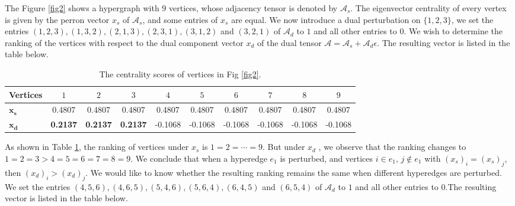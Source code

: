 \documentclass[preprint,12pt]{elsarticle}
\begin{document}
\begin{spacing}{1.15}
The Figure \ref{fig2} shows a hypergraph with $9$ vertices, whose adjacency tensor is denoted by $\mathcal{A}_s$.
The eigenvector centrality of every vertex is given by the perron vector $x_s$ of $\mathcal{A}_s$,
and some entries of $x_s$ are equal.
We now introduce a dual perturbation on $\{1, 2, 3\}$, we set the entries $(1,2,3),(1,3,2),(2,1,3),(2,3,1),(3,1,2)$ and $(3,2,1)$ of $\mathcal{A}_d$ to $1$ and all other entries to $0$.
We wish to determine the ranking of the vertices with respect to the dual component vector $x_d$ of the dual tensor $\mathcal{A}= \mathcal{A}_s + \mathcal{A}_d \epsilon$. The resulting vector is listed in the table below.

\begin{table}[h]
    \tiny
    \centering
    \caption{The centrality scores of vertices in Fig \ref{fig2}.}
    \label{table3}
    \begin{tabular}{lccccccccc}  %
    \toprule
    \textbf{Vertices} & \textbf{$1$} & \textbf{$2$} & \textbf{$3$} & \textbf{$4$} & \textbf{$5$} & \textbf{$6$}& \textbf{$7$}& \textbf{$8$}& \textbf{$9$} \\ \midrule
    \textbf{$\boldsymbol{x_s}$}  & 0.4807 & 0.4807 & 0.4807 & 0.4807 &0.4807 & 0.4807 & 0.4807 & 0.4807 & 0.4807 \\
    \textbf{$\boldsymbol{x_d}$} & \textbf{0.2137} & \textbf{0.2137} &\textbf{0.2137}  & -0.1068 & -0.1068 & -0.1068 & -0.1068 &-0.1068 & -0.1068\\
    \bottomrule
    \end{tabular}
\end{table}

As shown in Table \ref{table3}, the ranking of vertices under $x_s$ is $1 =2 = \cdots = 9 $.
But under $x_d$ , we observe that the ranking changes to $1 =2=3 >4=5=6=7=8=9$.
We conclude that when a hyperedge $e_1$ is perturbed, and vertices $i \in e_1$, $j \notin e_1$ with $(x_s)_i=(x_s)_j$, then $(x_d)_i>(x_d)_j$.
We would like to know whether the resulting ranking remains the same when different hyperedges are perturbed.
We set the entries $(4,5,6),(4,6,5),(5,4,6),(5,6,4),(6,4,5)$ and $(6,5,4)$ of $\mathcal{A}_d$ to $1$ and all other entries to $0$.The resulting vector is listed in the table below.


\end{spacing}
\end{document}
